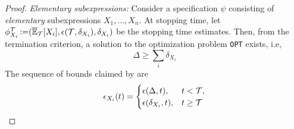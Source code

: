 \begin{proof}
\noindent \textit{Elementary subexpressions:} Consider a specification $\psi$ consisting of \textit{elementary} subexpressions $X_1, \dots, X_n$.
At stopping time, let $\phi^{\mathcal{T}}_{X_i} \operatorname{\vcentcolon=} (\overline{\mathbb{E}}_{\mathcal{T}}[X_i], \epsilon({\mathcal{T}}, \delta_{X_i}), \delta_{X_i})$ be the stopping time estimates. 
Then, from the termination criterion, a solution to the optimization problem \texttt{OPT} exists, i.e, 
\begin{equation}
    \Delta  \geq \sum_i \delta_{X_i}
    \label{thm:conf-seq:proof:delta-inequality}
\end{equation}
The sequence of bounds claimed by \AVOIRmethodname{} are
\begin{align}
    \epsilon_{X_i}(t) = 
    \begin{cases}
        \epsilon(\Delta, t), & t < {\mathcal{T}}, \\
        \epsilon(\delta_{X_i}, t), & t \geq {\mathcal{T}}
    \end{cases}
    \label{eqn:conf-seq:epsilon:def}
\end{align}


\end{proof}
